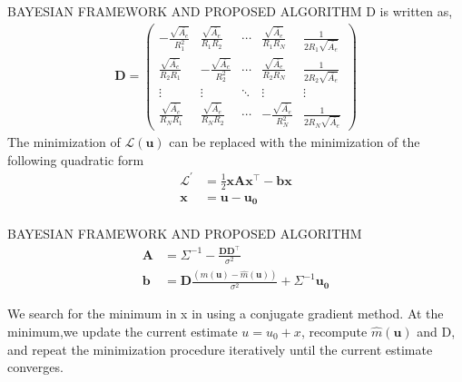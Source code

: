\documentclass{beamer}
\providecommand{\brak}[1]{\ensuremath{\left(#1\right)}}
\begin{document}
\begin{frame}{BAYESIAN FRAMEWORK AND PROPOSED ALGORITHM}
D is written as,
    \begin{align}
        \boldsymbol{D} = \begin{pmatrix}
-\frac{\sqrt{\bar{A_e}}}{R_1^2} & \frac{\sqrt{\bar{A_e}}}{R_1R_2}      & \cdots & \frac{\sqrt{\bar{A_e}}}{R_1R_N}       & \frac{1}{2R_1\sqrt{\bar{A_e}}} \\
\frac{\sqrt{\bar{A_e}}}{R_2R_1}     & -\frac{\sqrt{\bar{A_e}}}{R_2^2} & \cdots & \frac{\sqrt{\bar{A_e}}}{R_2R_N}      & \frac{1}{2R_2\sqrt{\bar{A_e}}}\\
\vdots & \vdots & \ddots & \vdots  & \vdots  \\
 \frac{\sqrt{\bar{A_e}}}{R_NR_1}    & \frac{\sqrt{\bar{A_e}}}{R_NR_2}     & \cdots & -\frac{\sqrt{\bar{A_e}}}{R_N^2}&\frac{1}{2R_N\sqrt{\bar{A_e}}}  
\end{pmatrix}
    \end{align}
    The minimization of $\mathcal{L}(\boldsymbol{u})$ can be replaced with the
minimization of the following quadratic form\\
    \begin{align}
   \mathcal{L}^{\prime}&=\frac{1}{2}\boldsymbol{x}\boldsymbol{A}\boldsymbol{x}^{\top}-\boldsymbol{b}\boldsymbol{x}\\
   \boldsymbol{x}&= \boldsymbol{u}-\boldsymbol{u_0}\\
   \end{align}
\end{frame}
\begin{frame}{BAYESIAN FRAMEWORK AND PROPOSED ALGORITHM}
\begin{align}
\boldsymbol{A}&= \Sigma^{-1}-\frac{\boldsymbol{D}\boldsymbol{D}^{\top}}{\sigma^2}\\
   \boldsymbol{b}&=\boldsymbol{D}\frac{\brak{m(\boldsymbol{u})-\hat{m}(\boldsymbol{u})}}{\sigma^2}+\Sigma^{-1}\boldsymbol{u_0}
\end{align}

We search for the minimum in x in using a conjugate gradient method. At the minimum,we update the current estimate $u = u_0 + x$, recompute $\hat{m}(\boldsymbol{u})$ and D, and repeat the minimization procedure iteratively until the current estimate converges.\\

\end{frame}
\end{document}
